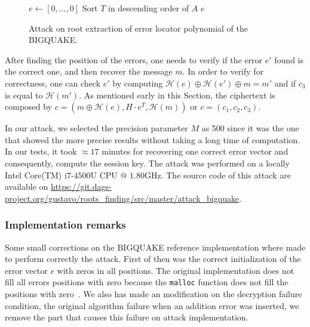 \begin{figure}[ht]
\centering
\begin{algorithm}[H]
 $e \gets [0,\ldots,0]$\;
Sort $T$ in descending order of $A$\;
\Return $e$\;
 \caption{Attack on root extraction of error locator polynomial of the BIGQUAKE.}
  \label{alg:attack:1}
\end{algorithm}
\end{figure}

After finding the position of the errors, one needs to verify if the error $e'$ found is the correct one, and then recover the message $m$. In order to verify for correctness, one can check $e'$ by computing $\mathcal{H}(e) \oplus \mathcal{H}(e') \oplus m = m'$ and if $c_3$ is equal to $\mathcal{H}(m')$. As mentioned early in this Section, the ciphertext is composed by $c = (m\oplus\mathcal{H}(e), H\cdot e^T, \mathcal{H}(m))$ or $c = (c_1, c_2, c_3)$.

In our attack, we selected the precision parameter $M$ as 500 since it was the one that showed the more precise results without taking a long time of computation.  In our tests, it took $\approx17$ minutes for recovering one correct error vector and consequently, compute the session key. The attack was performed on a locally Intel\textsuperscript{\tiny\textregistered} Core(TM) i$7$-$4500$U CPU @ $1.80$GHz. The source code of this attack are available on \url{https://git.dags-project.org/gustavo/roots_finding/src/master/attack_bigquake}.

\subsubsection{Implementation remarks}
Some small corrections on the BIGQUAKE reference implementation where made to perform correctly the attack. First of then was the correct initialization of the error vector $e$ with zeros in all positions. The original implementation does not fill all errors positions with zero because the \texttt{malloc} function does not fill the positions with zero~\cite{c++2014iso}. We also has made an modification on the decryption failure condition, the original algorithm failure when an addition error was inserted, we remove the part that causes this failure on attack implementation.

